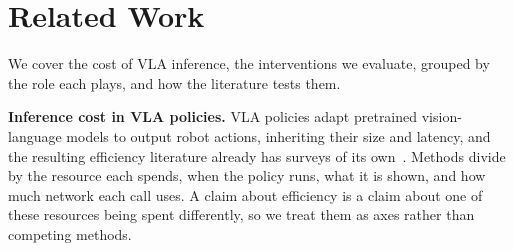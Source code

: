 %
%
%

\section{Related Work}

We cover the cost of VLA inference, the interventions we evaluate, grouped by
the role each plays, and how the literature tests them.

\textbf{Inference cost in VLA policies.} VLA policies adapt pretrained
vision-language models to output robot actions, inheriting their size and
latency, and the resulting efficiency literature already has surveys of its
own~\cite{effvlasurvey1}. Methods divide by the resource each spends, when the
policy runs, what it is shown, and how much network each call uses. A claim
about efficiency is a claim about one of these resources being spent
differently, so we treat them as axes rather than competing methods.

